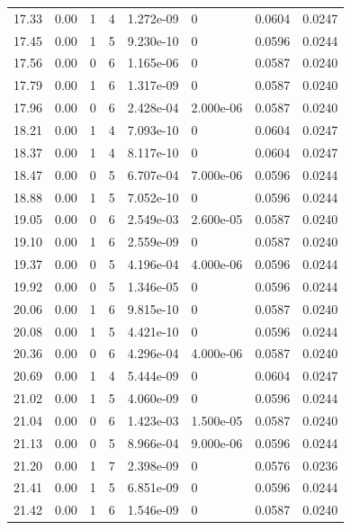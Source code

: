 \documentclass[preview]{standalone}
\begin{document}
{{{\begin{tabular}{L{1.2cm}C{1.2cm} C{0.3cm}C{0.5cm} C{1.4cm}C{1.4cm} C{1.4cm}C{1.4cm}}
  17.33  &  0.00  & 1     &  4 &  1.272e-09  & 0  & 0.0604 &  0.0247   \\ 
  17.45  &  0.00  & 1     &  5 &  9.230e-10  & 0  & 0.0596 &  0.0244   \\ 
  17.56  &  0.00  & 0     &  6 &  1.165e-06  & 0  & 0.0587 &  0.0240   \\ 
  17.79  &  0.00  & 1     &  6 &  1.317e-09  & 0  & 0.0587 &  0.0240   \\ 
  17.96  &  0.00  & 0     &  6 &  2.428e-04  & 2.000e-06  & 0.0587 &  0.0240   \\ 
  18.21  &  0.00  & 1     &  4 &  7.093e-10  & 0  & 0.0604 &  0.0247   \\ 
  18.37  &  0.00  & 1     &  4 &  8.117e-10  & 0  & 0.0604 &  0.0247   \\ 
  18.47  &  0.00  & 0     &  5 &  6.707e-04  & 7.000e-06  & 0.0596 &  0.0244   \\ 
  18.88  &  0.00  & 1     &  5 &  7.052e-10  & 0  & 0.0596 &  0.0244   \\ 
  19.05  &  0.00  & 0     &  6 &  2.549e-03  & 2.600e-05  & 0.0587 &  0.0240   \\ 
  19.10  &  0.00  & 1     &  6 &  2.559e-09  & 0  & 0.0587 &  0.0240   \\ 
  19.37  &  0.00  & 0     &  5 &  4.196e-04  & 4.000e-06  & 0.0596 &  0.0244   \\ 
  19.92  &  0.00  & 0     &  5 &  1.346e-05  & 0  & 0.0596 &  0.0244   \\ 
  20.06  &  0.00  & 1     &  6 &  9.815e-10  & 0  & 0.0587 &  0.0240   \\ 
  20.08  &  0.00  & 1     &  5 &  4.421e-10  & 0  & 0.0596 &  0.0244   \\ 
  20.36  &  0.00  & 0     &  6 &  4.296e-04  & 4.000e-06  & 0.0587 &  0.0240   \\ 
  20.69  &  0.00  & 1     &  4 &  5.444e-09  & 0  & 0.0604 &  0.0247   \\ 
  21.02  &  0.00  & 1     &  5 &  4.060e-09  & 0  & 0.0596 &  0.0244   \\ 
  21.04  &  0.00  & 0     &  6 &  1.423e-03  & 1.500e-05  & 0.0587 &  0.0240   \\ 
  21.13  &  0.00  & 0     &  5 &  8.966e-04  & 9.000e-06  & 0.0596 &  0.0244   \\ 
  21.20  &  0.00  & 1     &  7 &  2.398e-09  & 0  & 0.0576 &  0.0236   \\ 
  21.41  &  0.00  & 1     &  5 &  6.851e-09  & 0  & 0.0596 &  0.0244   \\ 
  21.42  &  0.00  & 1     &  6 &  1.546e-09  & 0  & 0.0587 &  0.0240   \\ 

\end{tabular}}}}
\end{document}

